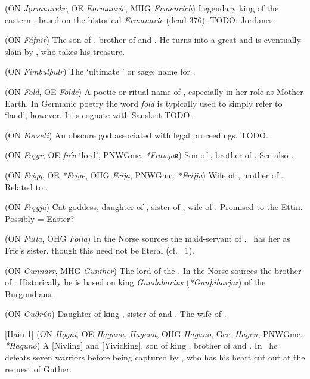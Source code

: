 \begin{itemize}
 (ON \emph{Jǫrmunrekr}, OE \emph{Eormanríc}, MHG \emph{Ermenrîch})
  Legendary king of the eastern , based on the historical \emph{Ermanaric} (dead 376).  TODO: Jordanes.

 (ON \emph{Fáfnir})
  The son of , brother of  and .  He turns into a great  and is eventually slain by , who takes his treasure.

 (ON \emph{Fimbulþulr})
  The ‘ultimate ’ or sage; name for .

 (ON \emph{Fold}, OE \emph{Folde})
  A poetic or ritual name of , especially in her role as Mother Earth.  In Germanic poetry the word \emph{fold} is typically used to simply refer to ‘land’, however.  It is cognate with Sanskrit TODO.

 (ON \emph{Forseti})
  An obscure god associated with legal proceedings. TODO.

 (ON \emph{Fręyr}, OE \emph{fréa} ‘lord’, PNWGmc. \emph{*Frawjaʀ})
  Son of , brother of . See also .

 (ON \emph{Frigg}, OE \emph{*Frige}, OHG \emph{Frija}, PNWGmc. \emph{*Frijju})
  Wife of , mother of . Related to .

 (ON \emph{Fręyja})
  Cat-goddess, daughter of , sister of , wife of . Promised to the Ettin. Possibly = Easter?

 (ON \emph{Fulla}, OHG \emph{Folla})
  In the Norse sources the maid-servant of .  \MerseburgTwo\ has her as Frie’s sister, though this need not be literal (cf. \Hyndluljod\ 1).

 (ON \emph{Gunnarr}, MHG \emph{Gunther})
  The lord of the .  In the Norse sources the brother of .  Historically he is based on king \emph{Gundaharius} (\emph{*Gunþiharjaz}) of the Burgundians.

 (ON \emph{Guðrún})
  Daughter of king , sister of  and . The wife of .

[Hain 1] (ON \emph{Hǫgni}, OE \emph{Haguna}, \emph{Hagena}, OHG \emph{Hagano}, Ger. \emph{Hagen}, PNWGmc. \emph{*Hagunó})
  A [Nivling] and [Yivicking], son of king , brother of  and . In \Atlakvida\ he defeats seven warriors before being captured by , who has his heart cut out at the request of Guther.


\end{itemize}
